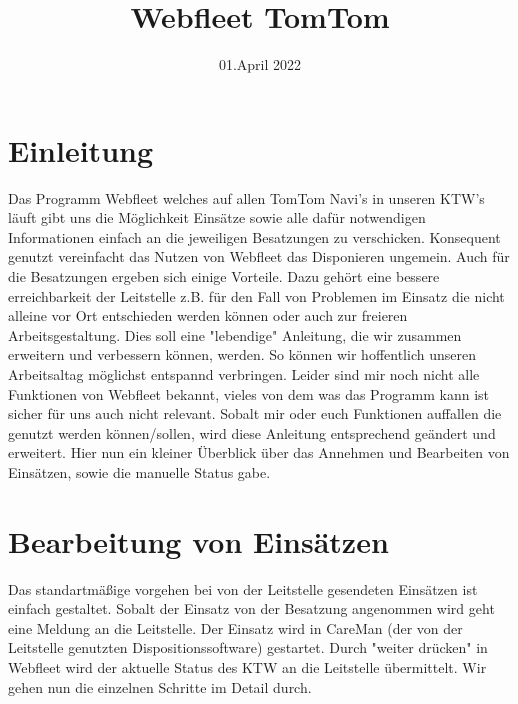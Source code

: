 \documentclass[a4paper,12pt]{scrartcl}
\title{Webfleet TomTom}
\date{01.April 2022}
\begin{document}
    \maketitle
    \tableofcontents
    
    \newpage
    \section{Einleitung}
    Das Programm Webfleet welches auf allen TomTom Navi's in unseren KTW's läuft gibt uns die Möglichkeit Einsätze sowie 
    alle dafür notwendigen Informationen einfach an die jeweiligen Besatzungen zu verschicken.
    Konsequent genutzt vereinfacht das Nutzen von Webfleet das Disponieren ungemein. Auch für die Besatzungen ergeben sich
    einige Vorteile. Dazu gehört eine bessere erreichbarkeit der Leitstelle z.B. für den Fall von Problemen im Einsatz die 
    nicht alleine vor Ort entschieden werden können oder auch zur freieren Arbeitsgestaltung. Dies soll eine "lebendige" Anleitung, die wir 
    zusammen erweitern und verbessern können, werden. So können wir hoffentlich unseren Arbeitsaltag möglichst entspannd verbringen.
    Leider sind mir noch nicht alle Funktionen von Webfleet bekannt, vieles von dem was das Programm kann ist sicher
    für uns auch nicht relevant. Sobalt mir oder euch Funktionen auffallen die genutzt werden können/sollen, wird diese Anleitung
    entsprechend geändert und erweitert. 
    Hier nun ein kleiner Überblick über das Annehmen und Bearbeiten von Einsätzen, sowie die manuelle Status gabe.
    
    \section{Bearbeitung von Einsätzen}
    Das standartmäßige vorgehen bei von der Leitstelle gesendeten Einsätzen ist einfach gestaltet. Sobalt der Einsatz von
    der Besatzung angenommen wird geht eine Meldung an die Leitstelle. Der Einsatz wird in CareMan (der von der Leitstelle 
    genutzten Dispositionssoftware) gestartet. Durch "weiter drücken" in Webfleet wird der aktuelle Status des KTW an die Leitstelle
    übermittelt. Wir gehen nun die einzelnen Schritte im Detail durch.
\end{document}
